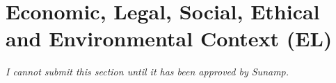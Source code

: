 
\section{Economic, Legal, Social, Ethical and Environmental Context (EL)}

\emph{I cannot submit this section until it has been approved by Sunamp.}

